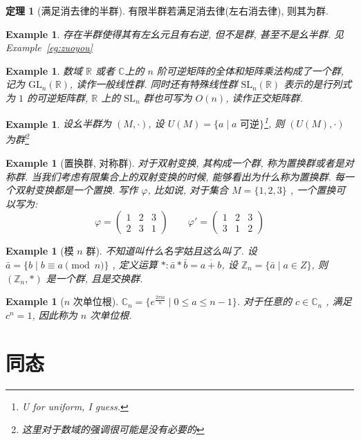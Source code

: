 \documentclass[12pt]{ctexart}
\theoremstyle{definition}
\theoremstyle{definition}
\newtheorem{thm}[definition]{定理}
\theoremstyle{plain}
\newtheorem{exam}[definition]{Example}
\theoremstyle{remark}
\begin{document}
\begin{thm}[满足消去律的半群]
有限半群若满足消去律(左右消去律), 则其为群.
\end{thm}

\begin{exam}
	存在半群使得其有左幺元且有右逆, 但不是群, 甚至不是幺半群. 见Example~\ref{eg:zuoyou}
\end{exam}
\begin{exam}
	数域 \(\mathbb{R}\) 或者 \(\mathbb{C}\)上的 \(n\) 阶可逆矩阵的全体和矩阵乘法构成了一个群, 记为 \(\text{GL}_{n} (\mathbb{R})\), 读作一般线性群. 同时还有特殊线性群 \(\text{SL}_{n} (\mathbb{R})\) 表示的是行列式为 \(1\) 的可逆矩阵群, \(\mathbb{R}\) 上的 \(\text{SL} _{n}\) 群也可写为 \(O(n)\), 读作正交矩阵群. 
\end{exam}
\begin{exam}
	设幺半群为 \( (M , \cdot )\), 设 \(U (M) = \{ a \mid a \text{ 可逆}\}\)\footnote{U for uniform, I guess.}, 则 \(( U (M), \cdot)\) 为群\footnote{这里对于数域的强调很可能是没有必要的}
\end{exam}
\begin{exam}[置换群, 对称群]\label{eg:sym}
	对于双射变换, 其构成一个群, 称为置换群或者是对称群. 当我们考虑有限集合上的双射变换的时候, 能够看出为什么称为置换群. 每一个双射变换都是一个置换. 写作 \(\varphi\), 比如说, 对于集合 \(M = \{ 1, 2 ,3 \}\) , 一个置换可以写为: 
	\begin{equation}
	\varphi = 
	\begin{pmatrix}
		1 & 2 & 3 \\ 
		2 & 3 & 1 
	\end{pmatrix}
	\qquad \varphi' = 
	\begin{pmatrix}
		1 & 2 & 3 \\ 
		3 & 1 & 2 
	\end{pmatrix}
	\end{equation}
\end{exam}

\begin{exam}[模 \(n\) 群]
	不知道叫什么名字姑且这么叫了. 
	设 \(\bar a = \{ b \mid b \equiv a \pmod{n}\}\) , 定义运算 \(* \colon \bar a * \bar b = \overline{a + b}\), 设 \(\mathbb{Z} _{n} = \{\bar a \mid a \in Z \}\), 则 \((\mathbb{Z}_{n} , *)\) 是一个群, 且是交换群. 
\end{exam}

\begin{exam}[\(n\) 次单位根]
	\(\mathbb{C} _{n} = \{ e ^{\frac{2\pi \mathrm i a}{n}} \mid  0 \le a \le n-1\}\). 
	对于任意的 \(c \in \mathbb{C}_{n}\) , 满足 \(c ^{n} = 1\), 因此称为 \(n\) 次单位根. 
\end{exam}

\section{同态}\label{sec:hom}
\end{document}
